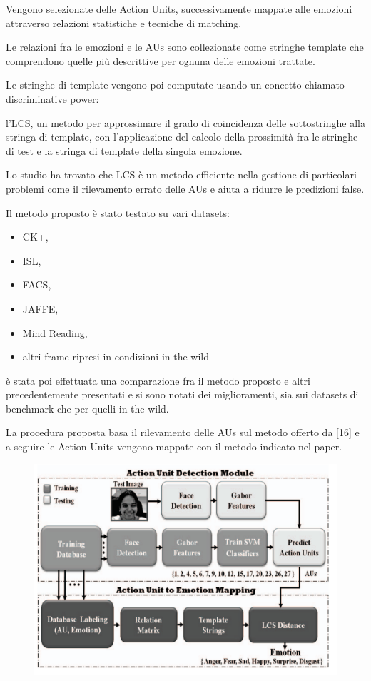 Vengono selezionate delle Action Units, successivamente mappate alle emozioni attraverso relazioni statistiche e tecniche di matching.

Le relazioni fra le emozioni e le AUs sono collezionate come stringhe template che comprendono quelle più descrittive per ognuna delle emozioni trattate.

Le stringhe di template vengono poi computate usando un concetto chiamato discriminative power:

l’LCS, un metodo per approssimare il grado di coincidenza delle sottostringhe alla stringa di template, con l’applicazione del calcolo della prossimità fra le stringhe di test e la stringa di template della singola emozione.

Lo studio ha trovato che LCS è un metodo efficiente nella gestione di particolari problemi come il rilevamento errato delle AUs e aiuta a ridurre le predizioni false.

Il metodo proposto è stato testato su vari datasets:
\begin{itemize}
    \item CK+,
    \item ISL,
    \item FACS,
    \item JAFFE,
    \item Mind Reading,
    \item altri frame ripresi in condizioni in-the-wild
\end{itemize}

è stata poi effettuata una comparazione fra il metodo proposto e altri precedentemente presentati e si sono notati dei miglioramenti, sia sui datasets di benchmark che per quelli in-the-wild.\newpage

La procedura proposta basa il rilevamento delle AUs sul metodo offerto da [16] e a seguire le Action Units vengono mappate con il metodo indicato nel paper.
\begin{figure}
    \begin{center}    
        \includegraphics[width=0.7\linewidth]{images/18.png}
    \end{center}
\end{figure}

